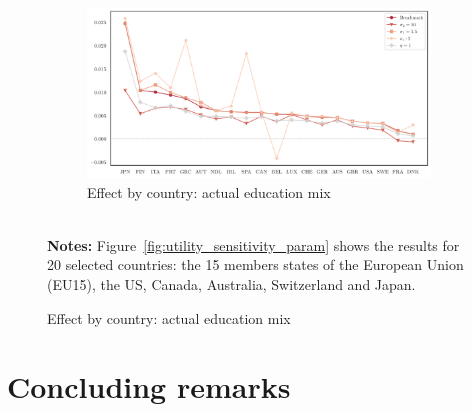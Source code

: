 \documentclass[a4paper,12pt]{article}
\begin{document}
\begin{landscape}
\begin{center}
\begin{figure}[h!]
\begin{subfigure}{.45\linewidth}
\end{subfigure}%
\hfill
\begin{subfigure}{.45\linewidth}
  \centering
        \caption{Effect by country: actual education mix}
  \includegraphics[width=\linewidth]{graphs/sens_Utility_LS+HS.pdf}
\end{subfigure}
\\[0.5cm]
{\footnotesize \textbf{Notes:} Figure~\ref{fig:utility_sensitivity_param} shows the results for 20 selected countries:
the 15 members states of the European Union (EU15), the US, Canada,
Australia, Switzerland and Japan.}
\end{figure}
\end{center}
\vspace*{\fill}
\end{landscape}
\restoregeometry

\section{Concluding remarks} \label{conclusion}
\end{document}
